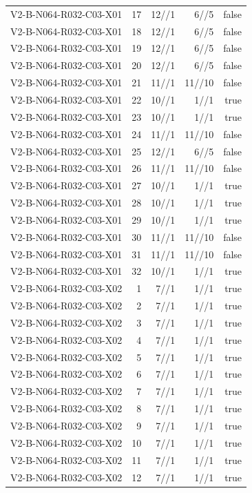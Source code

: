 {\begin{longtable}{lrrrr}
V2-B-N064-R032-C03-X01 & 17 & 12//1 & 6//5 & false \\
V2-B-N064-R032-C03-X01 & 18 & 12//1 & 6//5 & false \\
V2-B-N064-R032-C03-X01 & 19 & 12//1 & 6//5 & false \\
V2-B-N064-R032-C03-X01 & 20 & 12//1 & 6//5 & false \\
V2-B-N064-R032-C03-X01 & 21 & 11//1 & 11//10 & false \\
V2-B-N064-R032-C03-X01 & 22 & 10//1 & 1//1 & true \\
V2-B-N064-R032-C03-X01 & 23 & 10//1 & 1//1 & true \\
V2-B-N064-R032-C03-X01 & 24 & 11//1 & 11//10 & false \\
V2-B-N064-R032-C03-X01 & 25 & 12//1 & 6//5 & false \\
V2-B-N064-R032-C03-X01 & 26 & 11//1 & 11//10 & false \\
V2-B-N064-R032-C03-X01 & 27 & 10//1 & 1//1 & true \\
V2-B-N064-R032-C03-X01 & 28 & 10//1 & 1//1 & true \\
V2-B-N064-R032-C03-X01 & 29 & 10//1 & 1//1 & true \\
V2-B-N064-R032-C03-X01 & 30 & 11//1 & 11//10 & false \\
V2-B-N064-R032-C03-X01 & 31 & 11//1 & 11//10 & false \\
V2-B-N064-R032-C03-X01 & 32 & 10//1 & 1//1 & true \\
V2-B-N064-R032-C03-X02 & 1 & 7//1 & 1//1 & true \\
V2-B-N064-R032-C03-X02 & 2 & 7//1 & 1//1 & true \\
V2-B-N064-R032-C03-X02 & 3 & 7//1 & 1//1 & true \\
V2-B-N064-R032-C03-X02 & 4 & 7//1 & 1//1 & true \\
V2-B-N064-R032-C03-X02 & 5 & 7//1 & 1//1 & true \\
V2-B-N064-R032-C03-X02 & 6 & 7//1 & 1//1 & true \\
V2-B-N064-R032-C03-X02 & 7 & 7//1 & 1//1 & true \\
V2-B-N064-R032-C03-X02 & 8 & 7//1 & 1//1 & true \\
V2-B-N064-R032-C03-X02 & 9 & 7//1 & 1//1 & true \\
V2-B-N064-R032-C03-X02 & 10 & 7//1 & 1//1 & true \\
V2-B-N064-R032-C03-X02 & 11 & 7//1 & 1//1 & true \\
V2-B-N064-R032-C03-X02 & 12 & 7//1 & 1//1 & true \\

\end{longtable}}
